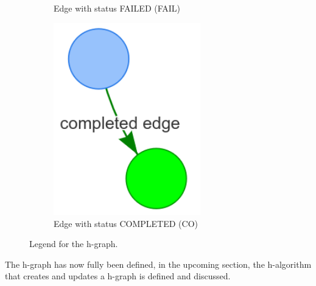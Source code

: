 \begin{figure}[H]
\begin{subfigure}{0.33\textwidth}
    \caption{Edge with status FAILED (FAIL)}%
    \end{subfigure}
    \begin{subfigure}{0.33\textwidth}
    \centering
    \includegraphics[width=0.7\textwidth]{figures/proposed_method/connecting_nodes/legend/completed_edge}
    \caption{Edge with status COMPLETED (CO)}%
    \end{subfigure}
    \caption{Legend for the \acl{h-graph}. }%
    \label{fig:h-graph_legend}
\end{figure}

The \ac{h-graph} has now fully been defined, in the upcoming section, the \ac{h-algorithm} that creates and updates a \ac{h-graph} is defined and discussed.\bs
